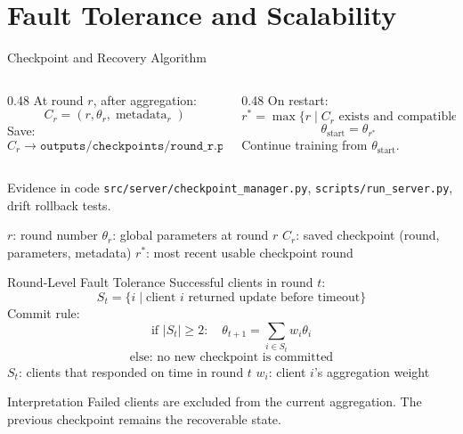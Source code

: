 \documentclass[aspectratio=169,10pt]{beamer}
\begin{document}
\section{Fault Tolerance and Scalability}

\begin{frame}{Checkpoint and Recovery Algorithm}
  \begin{columns}[T]
    \begin{column}{0.48\textwidth}
      At round \(r\), after aggregation:
      \[
        C_r = (r,\theta_r,\operatorname{metadata}_r)
      \]
      Save:
      \[
        C_r \rightarrow \texttt{outputs/checkpoints/round\_r.pt}
      \]
    \end{column}
    \begin{column}{0.48\textwidth}
      On restart:
      \[
        r^* = \max\{r \mid C_r \text{ exists and compatible}\}
      \]
      \[
        \theta_{\text{start}} = \theta_{r^*}
      \]
      Continue training from \(\theta_{\text{start}}\).
    \end{column}
  \end{columns}
  \begin{block}{Evidence in code}
    \texttt{src/server/checkpoint\_manager.py}, \texttt{scripts/run\_server.py}, drift rollback tests.
  \end{block}
  \footnotesize \(r\): round number \quad \(\theta_r\): global parameters at round \(r\) \quad \(C_r\): saved checkpoint (round, parameters, metadata) \quad \(r^*\): most recent usable checkpoint round
\end{frame}

\begin{frame}{Round-Level Fault Tolerance}
  Successful clients in round \(t\):
  \[
    S_t = \{i \mid \text{client } i \text{ returned update before timeout}\}
  \]
  Commit rule:
  \[
    \text{if } |S_t| \geq 2:
    \quad
    \theta_{t+1} = \sum_{i\in S_t} w_i\theta_i
  \]
  \[
    \text{else: no new checkpoint is committed}
  \]
  \footnotesize \(S_t\): clients that responded on time in round \(t\) \quad \(w_i\): client \(i\)'s aggregation weight
  \normalsize
  \begin{block}{Interpretation}
    Failed clients are excluded from the current aggregation. The previous checkpoint remains the recoverable state.
  \end{block}
\end{frame}
\end{document}
